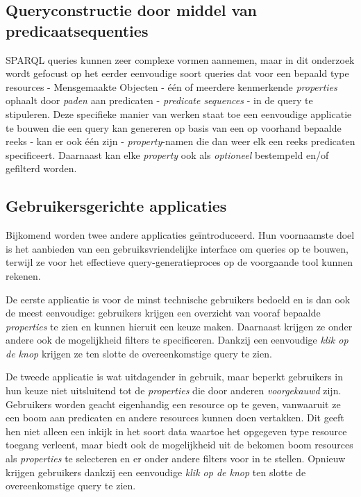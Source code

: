 \documentclass[conference]{IEEEtran}
\begin{document}
\subsection{Queryconstructie door middel van predicaatsequenties}
SPARQL queries kunnen zeer complexe vormen aannemen, maar in dit onderzoek wordt gefocust op het eerder eenvoudige soort queries dat voor een bepaald type resources - Mensgemaakte Objecten - één of meerdere kenmerkende \textit{properties} ophaalt door \textit{paden} aan predicaten - \textit{predicate sequences} - in de query te stipuleren. Deze specifieke manier van werken staat toe een eenvoudige applicatie te bouwen die een query kan genereren op basis van een op voorhand bepaalde reeks - kan er ook één zijn - \textit{property}-namen die dan weer elk een reeks predicaten specificeert. Daarnaast kan elke \textit{property} ook als \textit{optioneel} bestempeld en/of gefilterd worden.

\subsection{Gebruikersgerichte applicaties}
Bijkomend worden twee andere applicaties geïntroduceerd. Hun voornaamste doel is het aanbieden van een gebruiksvriendelijke interface om queries op te bouwen, terwijl ze voor het effectieve query-generatieproces op de voorgaande tool kunnen rekenen.

De eerste applicatie is voor de minst technische gebruikers bedoeld en is dan ook de meest eenvoudige: gebruikers krijgen een overzicht van vooraf bepaalde \textit{properties} te zien en kunnen hieruit een keuze maken. Daarnaast krijgen ze onder andere ook de mogelijkheid filters te specificeren. Dankzij een eenvoudige \textit{klik op de knop} krijgen ze ten slotte de overeenkomstige query te zien.

De tweede applicatie is wat uitdagender in gebruik, maar beperkt gebruikers in hun keuze niet uitsluitend tot de \textit{properties} die door anderen \textit{voorgekauwd} zijn. Gebruikers worden geacht eigenhandig een resource op te geven, vanwaaruit ze een boom aan predicaten en andere resources kunnen doen vertakken. Dit geeft hen niet alleen een inkijk in het soort data waartoe het opgegeven type resource toegang verleent, maar biedt ook de mogelijkheid uit de bekomen boom resources als \textit{properties} te selecteren en er onder andere filters voor in te stellen. Opnieuw krijgen gebruikers dankzij een eenvoudige \textit{klik op de knop} ten slotte de overeenkomstige query te zien.
\end{document}
